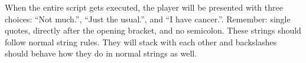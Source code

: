 \begin{SSCodeBox}
\scitea{} \\
\scitea{} \\
\scitea{\{} \\
\scitea{\hspace*{4em}}
\scitea{} \\
\scitea{;} \\
\scitea{} \\
\scitea{\hspace*{4em}}
\scitea{ = }
\scitea{;} \\
\scitea{\}} \\
\scitea{} \\
\scitea{} \\
\scitea{\{} \\
\scitea{\hspace*{4em}}
\scitea{} \\
\scitea{;} \\
\scitea{\hspace*{4em}} \\
\scitea{\hspace*{4em}}
\scitea{=}
\scitea{;} \\
\scitea{\}} \\
\scitea{} \\
\scitea{\{} \\
\scitea{\hspace*{4em}}
\scitea{} \\
\scitea{;} \\
\scitea{} \\
\scitea{\hspace*{4em}}
\scitea{=}
\scitea{;} \\
\scitea{\}}
\end{SSCodeBox}

When the entire script gets executed, the player will be presented with three choices: ``Not much.'', ``Just the usual.'', and ``I have cancer.''.  Remember: single quotes, directly after the opening bracket, and no semicolon.  These strings should follow normal string rules.  They will stack with each other and backslashes should behave how they do in normal strings as well.


